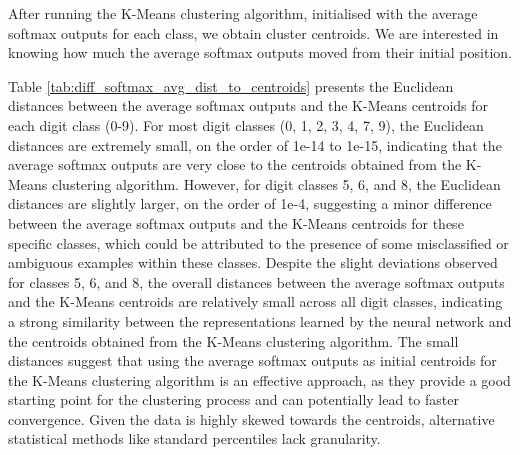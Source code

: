 After running the K-Means clustering algorithm, initialised with the  average softmax outputs for each class, we obtain cluster centroids. We are interested in knowing how much the average softmax outputs moved from their initial position. 

Table \ref{tab:diff_softmax_avg_dist_to_centroids} presents the Euclidean distances between the average softmax outputs and the K-Means centroids for each digit class (0-9). For most digit classes (0, 1, 2, 3, 4, 7, 9), the Euclidean distances are extremely small, on the order of 1e-14 to 1e-15, indicating that the average softmax outputs are very close to the centroids obtained from the K-Means clustering algorithm. However, for digit classes 5, 6, and 8, the Euclidean distances are slightly larger, on the order of 1e-4, suggesting a minor difference between the average softmax outputs and the K-Means centroids for these specific classes, which could be attributed to the presence of some misclassified or ambiguous examples within these classes.
Despite the slight deviations observed for classes 5, 6, and 8, the overall distances between the average softmax outputs and the K-Means centroids are relatively small across all digit classes, indicating a strong similarity between the representations learned by the neural network and the centroids obtained from the K-Means clustering algorithm. The small distances suggest that using the average softmax outputs as initial centroids for the K-Means clustering algorithm is an effective approach, as they provide a good starting point for the clustering process and can potentially lead to faster convergence. Given the data is highly skewed towards the centroids, alternative statistical methods like standard percentiles lack granularity.


